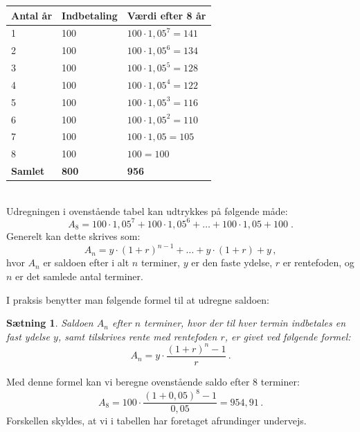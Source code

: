 \documentclass[12pt,oneside,a4paper]{article}
\newtheorem{thm}{Sætning}[section]
\begin{document}
\begin{tabular}{|l|l|l|}
    \hline
    \textbf{Antal år} & \textbf{Indbetaling} & \textbf{Værdi efter 8 år} \\
    \hline
    1 & 100 & $100 \cdot 1,05^7 = 141$ \\
    \hline
    2 & 100 & $100 \cdot 1,05^6 = 134$ \\
    \hline
    3 & 100 & $100 \cdot 1,05^5 = 128$ \\
    \hline
    4 & 100 & $100 \cdot 1,05^4 = 122$ \\
    \hline
    5 & 100 & $100 \cdot 1,05^3 = 116$ \\
    \hline
    6 & 100 & $100 \cdot 1,05^2 = 110$ \\
    \hline
    7 & 100 & $100 \cdot 1,05 = 105$ \\
    \hline
    8 & 100 & $100 = 100$ \\
    \hline
    \textbf{Samlet} & \textbf{800} & \textbf{956} \\
    \hline
\end{tabular}
\\

Udregningen i ovenstående tabel kan udtrykkes på følgende måde:
\[
A_8 = 100\cdot 1,05^7 + 100 \cdot 1,05^6 + \ldots + 100 \cdot 1,05 + 100 \;.
\]
Generelt kan dette skrives som:
\[
A_n = y\cdot(1+r)^{n-1} + \ldots + y\cdot(1+r) + y \,,
\]
hvor $A_n$ er saldoen efter i alt $n$ terminer,  $y$ er den faste
ydelse, $r$ er rentefoden, og $n$ er det samlede antal terminer.

I praksis benytter man følgende formel til at udregne saldoen:
\begin{tcolorbox}
\begin{thm}
Saldoen $A_n$ efter $n$ terminer, hvor der til hver termin indbetales en fast ydelse $y$,
samt tilskrives rente med rentefoden $r$, er givet ved følgende formel:
\[
A_n = y\cdot\frac{(1+r)^n-1}{r}\,.
\]
\end{thm}
\end{tcolorbox}

Med denne formel kan vi beregne ovenstående saldo efter 8 terminer:
\[
A_8 = 100\cdot\frac{(1+0,05)^8-1}{0,05} = 954,91 \,.
\]
Forskellen skyldes, at vi i tabellen har foretaget afrundinger undervejs.
\end{document}
